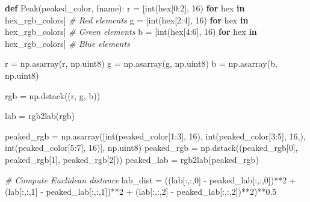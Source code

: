 \documentclass[11pt]{article}
\newenvironment{Shaded}{}{}
\newcommand{\KeywordTok}[1]{\textcolor[rgb]{0.00,0.44,0.13}{\textbf{{#1}}}}
\newcommand{\DecValTok}[1]{\textcolor[rgb]{0.25,0.63,0.44}{{#1}}}
\newcommand{\FloatTok}[1]{\textcolor[rgb]{0.25,0.63,0.44}{{#1}}}
\newcommand{\CommentTok}[1]{\textcolor[rgb]{0.38,0.63,0.69}{\textit{{#1}}}}
\newcommand{\NormalTok}[1]{{#1}}
\newcommand{\ControlFlowTok}[1]{\textcolor[rgb]{0.00,0.44,0.13}{\textbf{{#1}}}}
\newcommand{\OperatorTok}[1]{\textcolor[rgb]{0.40,0.40,0.40}{{#1}}}
\newcommand{\BuiltInTok}[1]{{#1}}
\begin{document}
\begin{Shaded}
\begin{Highlighting}[]
\KeywordTok{def}\NormalTok{ Peak(peaked_color, fname):}
\NormalTok{    r }\OperatorTok{=}\NormalTok{ [}\BuiltInTok{int}\NormalTok{(}\BuiltInTok{hex}\NormalTok{[}\DecValTok{0}\NormalTok{:}\DecValTok{2}\NormalTok{], }\DecValTok{16}\NormalTok{) }\ControlFlowTok{for} \BuiltInTok{hex} \KeywordTok{in}\NormalTok{ hex_rgb_colors] }
    \CommentTok{# Red elements}
\NormalTok{    g }\OperatorTok{=}\NormalTok{ [}\BuiltInTok{int}\NormalTok{(}\BuiltInTok{hex}\NormalTok{[}\DecValTok{2}\NormalTok{:}\DecValTok{4}\NormalTok{], }\DecValTok{16}\NormalTok{) }\ControlFlowTok{for} \BuiltInTok{hex} \KeywordTok{in}\NormalTok{ hex_rgb_colors] }
    \CommentTok{# Green elements}
\NormalTok{    b }\OperatorTok{=}\NormalTok{ [}\BuiltInTok{int}\NormalTok{(}\BuiltInTok{hex}\NormalTok{[}\DecValTok{4}\NormalTok{:}\DecValTok{6}\NormalTok{], }\DecValTok{16}\NormalTok{) }\ControlFlowTok{for} \BuiltInTok{hex} \KeywordTok{in}\NormalTok{ hex_rgb_colors] }
    \CommentTok{# Blue elements}

\NormalTok{    r }\OperatorTok{=}\NormalTok{ np.asarray(r, np.uint8)}
\NormalTok{    g }\OperatorTok{=}\NormalTok{ np.asarray(g, np.uint8)}
\NormalTok{    b }\OperatorTok{=}\NormalTok{ np.asarray(b, np.uint8)}

\NormalTok{    rgb }\OperatorTok{=}\NormalTok{ np.dstack((r, g, b))}

\NormalTok{    lab }\OperatorTok{=}\NormalTok{ rgb2lab(rgb)}

\NormalTok{    peaked_rgb }\OperatorTok{=}\NormalTok{ np.asarray([}\BuiltInTok{int}\NormalTok{(peaked_color[}\DecValTok{1}\NormalTok{:}\DecValTok{3}\NormalTok{], }\DecValTok{16}\NormalTok{), }
    \BuiltInTok{int}\NormalTok{(peaked_color[}\DecValTok{3}\NormalTok{:}\DecValTok{5}\NormalTok{], }\DecValTok{16}\NormalTok{,), }\BuiltInTok{int}\NormalTok{(peaked_color[}\DecValTok{5}\NormalTok{:}\DecValTok{7}\NormalTok{], }
        \DecValTok{16}\NormalTok{)], np.uint8)}
\NormalTok{    peaked_rgb }\OperatorTok{=}\NormalTok{ np.dstack((peaked_rgb[}\DecValTok{0}\NormalTok{], peaked_rgb[}\DecValTok{1}\NormalTok{], }
\NormalTok{        peaked_rgb[}\DecValTok{2}\NormalTok{]))}
\NormalTok{    peaked_lab }\OperatorTok{=}\NormalTok{ rgb2lab(peaked_rgb)}

    \CommentTok{# Compute Euclidean distance}
\NormalTok{    lab_dist }\OperatorTok{=}\NormalTok{ ((lab[:,:,}\DecValTok{0}\NormalTok{] }\OperatorTok{-}\NormalTok{ peaked_lab[:,:,}\DecValTok{0}\NormalTok{])}\OperatorTok{**}\DecValTok{2} \OperatorTok{+} 
\NormalTok{        (lab[:,:,}\DecValTok{1}\NormalTok{] }\OperatorTok{-}\NormalTok{ peaked_lab[:,:,}\DecValTok{1}\NormalTok{])}\OperatorTok{**}\DecValTok{2} \OperatorTok{+}\NormalTok{ (lab[:,:,}\DecValTok{2}\NormalTok{] }\OperatorTok{-} 
\NormalTok{        peaked_lab[:,:,}\DecValTok{2}\NormalTok{])}\OperatorTok{**}\DecValTok{2}\NormalTok{)}\OperatorTok{**}\FloatTok{0.5}


\end{Highlighting}
\end{Shaded}
\end{document}
